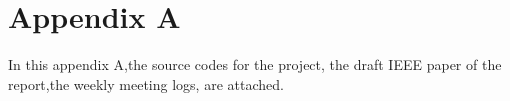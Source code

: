 \chapter{Appendix A}
	
In this appendix A,the source codes for the project, the draft IEEE paper of the report,the weekly meeting logs,  are attached.

